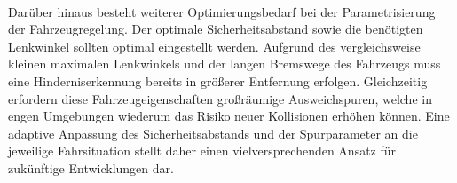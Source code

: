 \\
Darüber hinaus besteht weiterer Optimierungsbedarf bei der Parametrisierung der Fahrzeugregelung. Der optimale Sicherheitsabstand sowie die benötigten Lenkwinkel sollten optimal eingestellt werden. Aufgrund des vergleichsweise kleinen maximalen Lenkwinkels und der langen Bremswege des Fahrzeugs muss eine Hinderniserkennung bereits in größerer Entfernung erfolgen. Gleichzeitig erfordern diese Fahrzeugeigenschaften großräumige Ausweichspuren, welche in engen Umgebungen wiederum das Risiko neuer Kollisionen erhöhen können. Eine adaptive Anpassung des Sicherheitsabstands und der Spurparameter an die jeweilige Fahrsituation stellt daher einen vielversprechenden Ansatz für zukünftige Entwicklungen dar.
